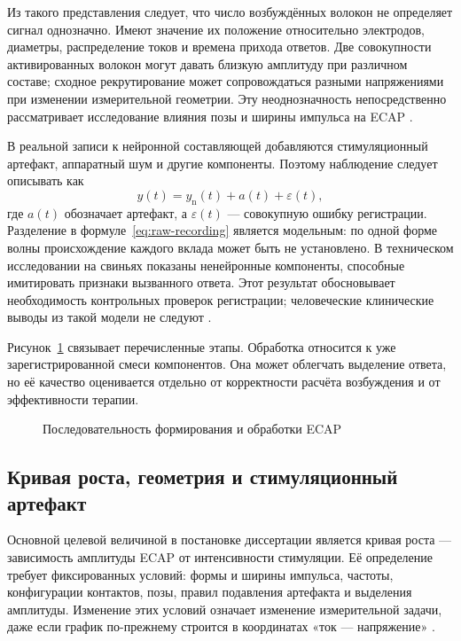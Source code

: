 Из такого представления следует, что число возбуждённых волокон не определяет сигнал однозначно. Имеют значение их положение относительно электродов, диаметры, распределение токов и времена прихода ответов. Две совокупности активированных волокон могут давать близкую амплитуду при различном составе; сходное рекрутирование может сопровождаться разными напряжениями при изменении измерительной геометрии. Эту неоднозначность непосредственно рассматривает исследование влияния позы и ширины импульса на ECAP \cite{posture}.

В реальной записи к нейронной составляющей добавляются стимуляционный артефакт, аппаратный шум и другие компоненты. Поэтому наблюдение следует описывать как
\begin{equation}
 y(t)=y_{\mathrm n}(t)+a(t)+\varepsilon(t),
 \label{eq:raw-recording}
\end{equation}
где $a(t)$ обозначает артефакт, а $\varepsilon(t)$ --- совокупную ошибку регистрации. Разделение в формуле~\eqref{eq:raw-recording} является модельным: по одной форме волны происхождение каждого вклада может быть не установлено. В техническом исследовании на свиньях показаны ненейронные компоненты, способные имитировать признаки вызванного ответа. Этот результат обосновывает необходимость контрольных проверок регистрации; человеческие клинические выводы из такой модели не следуют \cite{s798}.

Рисунок~\ref{fig:ecap-formation} связывает перечисленные этапы. Обработка относится к уже зарегистрированной смеси компонентов. Она может облегчать выделение ответа, но её качество оценивается отдельно от корректности расчёта возбуждения и от эффективности терапии.

\begin{figure}[htbp]
\centering

\caption{Последовательность формирования и обработки ECAP}
\label{fig:ecap-formation}
\end{figure}
\FloatBarrier

\subsection{Кривая роста, геометрия и стимуляционный артефакт}

Основной целевой величиной в постановке диссертации является кривая роста --- зависимость амплитуды ECAP от интенсивности стимуляции. Её определение требует фиксированных условий: формы и ширины импульса, частоты, конфигурации контактов, позы, правил подавления артефакта и выделения амплитуды. Изменение этих условий означает изменение измерительной задачи, даже если график по-прежнему строится в координатах «ток --- напряжение» \cite{posture,s787}.

